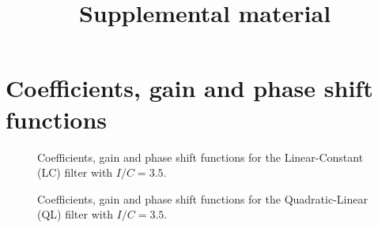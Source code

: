 \documentclass[
]{article}
\title{Supplemental material}
\author{}
\date{}
\newcommand\1{\mathds{1}}
\begin{document}
\maketitle

\appendix

\section{Coefficients, gain and phase shift functions}\label{sec-an-cof}

\begin{figure}

\caption{\label{fig-graphs-coef-lc}Coefficients, gain and phase shift
functions for the Linear-Constant (LC) filter with \(I/C=3.5\).}


\end{figure}%

\begin{figure}

\caption{\label{fig-graphs-coef-ql}Coefficients, gain and phase shift
functions for the Quadratic-Linear (QL) filter with \(I/C=3.5\).}


\end{figure}%
\end{document}
